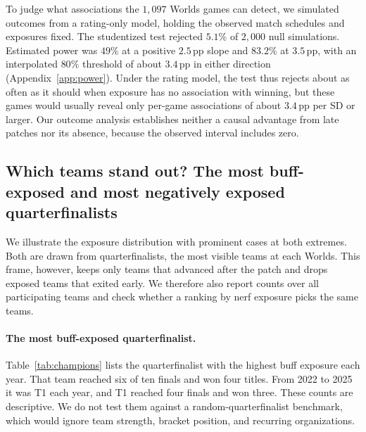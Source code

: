 \documentclass[11pt]{article}
\newcommand{\pp}{\,pp}
\begin{document}
To judge what associations the $1{,}097$ Worlds games can detect, we simulated outcomes from a rating-only model, holding the observed match schedules and exposures fixed. The studentized test rejected $5.1\%$ of $2{,}000$ null simulations. Estimated power was $49\%$ at a positive $2.5$\pp{} slope and $83.2\%$ at $3.5$\pp{}, with an interpolated $80\%$ threshold of about $3.4$\pp{} in either direction (Appendix~\ref{app:power}). Under the rating model, the test thus rejects about as often as it should when exposure has no association with winning, but these games would usually reveal only per-game associations of about $3.4$\pp{} per SD or larger. Our outcome analysis establishes neither a causal advantage from late patches nor its absence, because the observed interval includes zero.

\subsection{Which teams stand out? The most buff-exposed and most negatively exposed quarterfinalists}
\label{sec:cases}
We illustrate the exposure distribution with prominent cases at both extremes. Both are drawn from quarterfinalists, the most visible teams at each Worlds. This frame, however, keeps only teams that advanced after the patch and drops exposed teams that exited early. We therefore also report counts over all participating teams and check whether a ranking by nerf exposure picks the same teams.

\paragraph{The most buff-exposed quarterfinalist.}
Table~\ref{tab:champions} lists the quarterfinalist with the highest buff exposure each year. That team reached six of ten finals and won four titles. From 2022 to 2025 it was T1 each year, and T1 reached four finals and won three. These counts are descriptive. We do not test them against a random-quarterfinalist benchmark, which would ignore team strength, bracket position, and recurring organizations.
\end{document}
